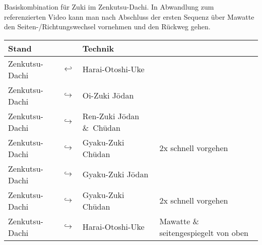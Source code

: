 	\null\vfill\null
	\begin{center}
		\parbox{\textwidth-2\tabcolsep}{Basiskombination für Zuki im Zenkutsu-Dachi. In Abwandlung zum referenzierten Video kann man nach Abschluss der ersten Sequenz über Mawatte den Seiten-/Richtungswechsel vornehmen und den Rückweg gehen.}
	\end{center}
	\begin{tabularx}{\textwidth}{lllX}
		Stand	&&Technik	&\\
		\midrule
		Zenkutsu-Dachi 	& \(\hookleftarrow\) & Harai-Otoshi-Uke	&\\
		Zenkutsu-Dachi 	& \(\hookrightarrow\) & Oi-Zuki J\={o}dan	&\\
		Zenkutsu-Dachi 	& \(\hookrightarrow\) & Ren-Zuki J\={o}dan \&~Ch\={u}dan	&\\
		Zenkutsu-Dachi 	& \(\hookrightarrow\) & Gyaku-Zuki Ch\={u}dan	&2x schnell vorgehen\\
		Zenkutsu-Dachi 	& \(\hookrightarrow\) & Gyaku-Zuki J\={o}dan	&\\
		Zenkutsu-Dachi 	& \(\hookrightarrow\) & Gyaku-Zuki Ch\={u}dan	&2x schnell vorgehen\\
		Zenkutsu-Dachi 	& \(\hookrightarrow\) & Harai-Otoshi-Uke	& Mawatte \& seitengespiegelt von oben\\
		\midrule
	\end{tabularx}\\\null\vfill\null